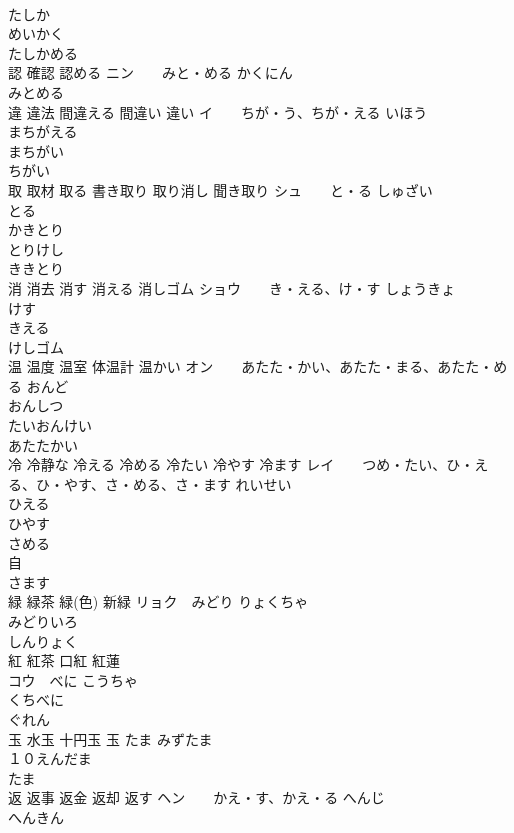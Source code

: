 \documentclass[8pt]{extreport}
\begin{document}
\begin{CJK}{UTF8}{min}
\\	たしか 
\\	めいかく 
\\	たしかめる 
\\	認 確認 認める	ニン　　みと・める かくにん 
\\	みとめる　
\\	違 違法 間違える 間違い 違い	イ　　ちが・う、ちが・える いほう 
\\	まちがえる 
\\	まちがい 
\\	ちがい 
\\	取 取材 取る 書き取り 取り消し 聞き取り	シュ　　と・る しゅざい 
\\	とる 
\\	かきとり 
\\	とりけし 
\\	ききとり 
\\	消 消去 消す 消える 消しゴム	ショウ　　き・える、け・す しょうきょ 
\\	けす 
\\	きえる 
\\	けしゴム 
\\	温 温度 温室 体温計 温かい	オン　　あたた・かい、あたた・まる、あたた・める おんど 
\\	おんしつ 
\\	たいおんけい 
\\	あたたかい 
\\	冷 冷静な 冷える 冷める 冷たい 冷やす 冷ます	レイ　　つめ・たい、ひ・える、ひ・やす、さ・める、さ・ます れいせい　
\\	ひえる 
\\	ひやす 
\\	さめる　
\\	自 
\\	さます 
\\	緑 緑茶 緑(色) 新緑	リョク　みどり りょくちゃ 
\\	みどりいろ 
\\	しんりょく 
\\	紅 紅茶 口紅 紅蓮
\\	コウ　べに こうちゃ 
\\	くちべに 
\\	ぐれん 
\\	玉 水玉 十円玉 玉	たま みずたま　
\\	１０えんだま 
\\	たま 
\\	返 返事 返金 返却 返す	ヘン　　かえ・す、かえ・る へんじ 
\\	へんきん 

\end{CJK}
\end{document}
